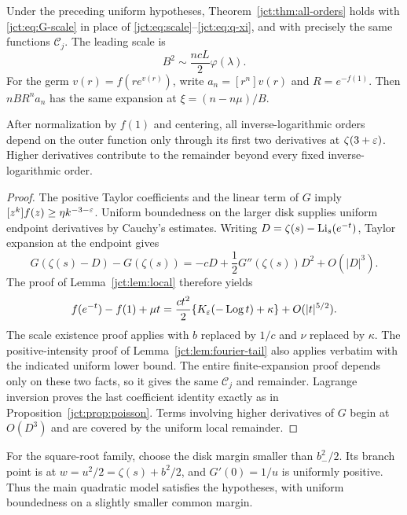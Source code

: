 \begin{theorem}
\label{jct:thm:universality}
Under the preceding uniform hypotheses, Theorem~\ref{jct:thm:all-orders}
holds with \eqref{jct:eq:G-scale} in place of
\eqref{jct:eq:scale}--\eqref{jct:eq:q-xi}, and with precisely the same
functions $\mathcal C_j$. The leading scale is
\begin{equation}\label{jct:eq:G-leading}
 B^2\sim\frac{ncL}{2}\varphi(\lambda).
\end{equation}
For the germ $v(r)=f(re^{v(r)})$, write $a_n=[r^n]v(r)$ and
$R=e^{-f(1)}$. Then $nBR^n a_n$ has the same expansion at
$\xi=(n-n\mu)/B$.

After normalization by $f(1)$ and centering, all inverse-logarithmic
orders depend on the outer function only through its first two
derivatives at $\zeta(3+\varepsilon)$. Higher derivatives contribute to the
remainder beyond every fixed inverse-logarithmic order.
\end{theorem}

\begin{proof}
The positive Taylor coefficients and the linear term of $G$ imply
$[z^k]f(z)\ge\eta k^{-3-\varepsilon}$. Uniform boundedness on the larger
disk supplies uniform endpoint derivatives by Cauchy's estimates.
Writing $D=\zeta(s)-\operatorname{Li}_s(e^{-t})$, Taylor expansion at the endpoint
gives
\[
 G(\zeta(s)-D)-G(\zeta(s))
 =-cD+\frac12G''(\zeta(s))D^2+O(|D|^3).
\]
The proof of Lemma~\ref{jct:lem:local} therefore yields
\[
 f(e^{-t})-f(1)+\mu t
  =\frac{ct^2}{2}\{K_\varepsilon(-\operatorname{Log} t)+\kappa\}
                                      +O(|t|^{5/2}).
\]
The scale existence proof applies with $b$ replaced by $1/c$ and
$\nu$ replaced by $\kappa$. The positive-intensity proof of
Lemma~\ref{jct:lem:fourier-tail} also applies verbatim with the indicated
uniform lower bound. The entire finite-expansion proof depends only
on these two facts, so it gives the same $\mathcal C_j$ and remainder.
Lagrange inversion proves the last coefficient identity exactly as in
Proposition~\ref{jct:prop:poisson}. Terms involving higher derivatives of $G$ begin
at $O(D^3)$ and are covered by the uniform local remainder.
\end{proof}

For the square-root family, choose the disk margin smaller than
$b_-^2/2$. Its branch point is at
$w=u^2/2=\zeta(s)+b^2/2$, and $G'(0)=1/u$ is uniformly positive.
Thus the main quadratic model satisfies the hypotheses, with uniform
boundedness on a slightly smaller common margin.

